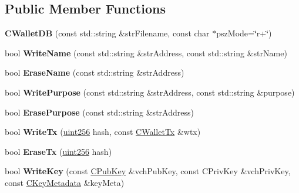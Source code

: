 \subsection*{Public Member Functions}
\begin{DoxyCompactItemize}
\item 
\mbox{\label{class_c_wallet_d_b_abb8766ee5b03e8115438726c625f88a7}} 
{\bfseries C\+Wallet\+DB} (const std\+::string \&str\+Filename, const char $\ast$psz\+Mode=\char`\"{}r+\char`\"{})
\item 
\mbox{\label{class_c_wallet_d_b_ad1b3bce77e9dd6ddd8c668a469c38f0a}} 
bool {\bfseries Write\+Name} (const std\+::string \&str\+Address, const std\+::string \&str\+Name)
\item 
\mbox{\label{class_c_wallet_d_b_a319209fcf90ea860b668b92c44a3fa7a}} 
bool {\bfseries Erase\+Name} (const std\+::string \&str\+Address)
\item 
\mbox{\label{class_c_wallet_d_b_a8d4e8d73b977dc62c137bd3543c278bf}} 
bool {\bfseries Write\+Purpose} (const std\+::string \&str\+Address, const std\+::string \&purpose)
\item 
\mbox{\label{class_c_wallet_d_b_adaba27cee112077ade5b2e795382cec6}} 
bool {\bfseries Erase\+Purpose} (const std\+::string \&str\+Address)
\item 
\mbox{\label{class_c_wallet_d_b_a76d2ca02898221ab66df5d5f7491164e}} 
bool {\bfseries Write\+Tx} (\mbox{\hyperlink{classuint256}{uint256}} hash, const \mbox{\hyperlink{class_c_wallet_tx}{C\+Wallet\+Tx}} \&wtx)
\item 
\mbox{\label{class_c_wallet_d_b_a498e00c693cacc4b558e6f5295ea32f2}} 
bool {\bfseries Erase\+Tx} (\mbox{\hyperlink{classuint256}{uint256}} hash)
\item 
\mbox{\label{class_c_wallet_d_b_a7ebef5e0c7f604aa2159ba96d527e3a2}} 
bool {\bfseries Write\+Key} (const \mbox{\hyperlink{class_c_pub_key}{C\+Pub\+Key}} \&vch\+Pub\+Key, const C\+Priv\+Key \&vch\+Priv\+Key, const \mbox{\hyperlink{class_c_key_metadata}{C\+Key\+Metadata}} \&key\+Meta)
\item 

\end{DoxyCompactItemize}
